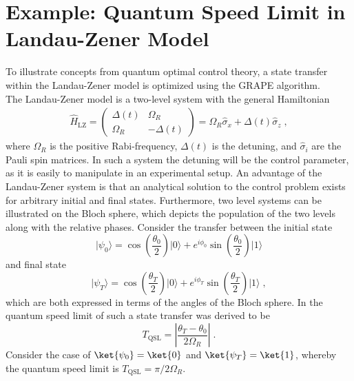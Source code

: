 \chapter{Example: Quantum Speed Limit in Landau-Zener Model} \label{chap:LZexample}
To illustrate concepts from quantum optimal control theory, a state transfer within the Landau-Zener model is optimized using the GRAPE algorithm.\\
The Landau-Zener model is a two-level system with the general Hamiltonian
\begin{align}
	\hat{H}_{\mathrm{LZ}} = \begin{pmatrix}
    	 \Delta (t) & \Omega_R    \\
         \Omega_R & -\Delta (t) 		
    \end{pmatrix}  = \Omega_R \hat{\sigma}_x + \Delta (t) \hat{\sigma}_z \; , \label{eq:LZhamiltonian}
\end{align}
where $\Omega_R$ is the positive Rabi-frequency, $\Delta (t)$ is the detuning, and $\hat{\sigma}_i$ are the Pauli spin matrices. In such a system the detuning will be the control parameter, as it is easily to manipulate in an experimental setup. An advantage of the Landau-Zener system is that an analytical solution to the control problem exists for arbitrary initial and final states. Furthermore, two level systems can be illustrated on the Bloch sphere, which depicts the population of the two levels along with the relative phases. Consider the transfer between the initial state
\begin{equation}
\lvert \psi_0 \rangle = \cos{\left(\frac{\theta_0}{2}\right)} \lvert 0 \rangle + e^{i\phi_0}\sin{\left(\frac{\theta_0}{2}\right)}\lvert 1 \rangle 
\end{equation}
and final state
\begin{equation}
\lvert \psi_T \rangle = \cos{\left(\frac{\theta_T}{2}\right)} \lvert 0 \rangle + e^{i\phi_T}\sin{\left(\frac{\theta_T}{2}\right)}\lvert 1 \rangle \; ,
\end{equation}
which are both expressed in terms of the angles of the Bloch sphere.
In \cite{QOCTtwolevel} the quantum speed limit of such a state transfer was derived to be 
\begin{equation}
	T_{\mathrm{QSL}} = \left\lvert \frac{\theta_T - \theta_0}{2 \Omega_R} \right\rvert \; . 
\end{equation}
Consider the case of $\ket{\psi_0} = \ket{0}$ and $\ket{\psi_T} = \ket{1}$, whereby the quantum speed limit is $T_{\mathrm{QSL}} = {\pi}/{2 \Omega_R}$. 


